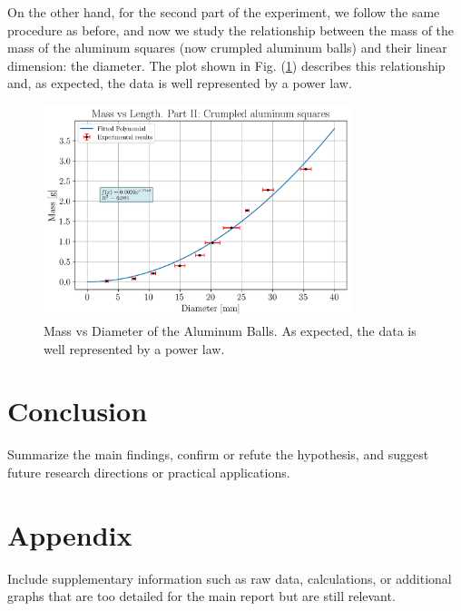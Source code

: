 \documentclass[a4paper,12pt]{article}
\begin{document}
On the other hand, for the second part of the experiment, we follow the same procedure as before, and now we study the relationship between the mass 
of the mass of the aluminum squares (now crumpled aluminum balls) and their linear dimension: the diameter. The plot shown in Fig. (\ref{fig:mass_vs_diameter}) 
describes this relationship and, as expected, the data is well represented by a power law.
\begin{figure}
    \centering
    \includegraphics[width = 0.8\textwidth]{mass_vs_diameter.png}
    \caption{Mass vs Diameter of the Aluminum Balls. As expected, the data is well represented by a power law.}
    \label{fig:mass_vs_diameter}
\end{figure}

\section{Conclusion}\label{sec:conclusion}
Summarize the main findings, confirm or refute the hypothesis, and suggest future research directions or practical applications.

\section{Appendix}
Include supplementary information such as raw data, calculations, or additional graphs that are too detailed for the main report but are still relevant.

\printbibliography
\end{document}

